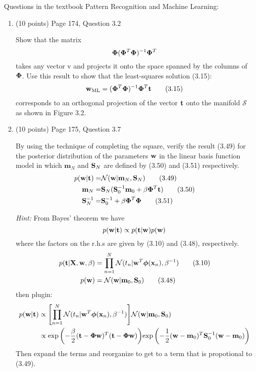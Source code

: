 \documentclass[11pt]{article}
\begin{document}
Questions in the textbook Pattern Recognition and Machine Learning:
\begin{enumerate}
\item (10 points) Page 174, Question 3.2
\begin{framed}
Show that the matrix
$$ \bm{\Phi} (\bm{\Phi}^T \bm{\Phi})^{-1} \bm{\Phi}^T $$
takes any vector v and projects it onto the space spanned by the columns of $\bm{\Phi}$. Use this result to show that the least-squares solution (3.15):
\begin{align*}%
\bw_{\text{ML}} = (\bPhi^T \bPhi)^{-1} \bPhi^T \bt \tag{3.15}
\end{align*}
 corresponds to an orthogonal projection of the vector $\mathbf{t}$ onto the manifold $\mathcal S$ as shown in Figure 3.2.
\end{framed}

\item (10 points) Page 175, Question 3.7
\begin{framed}
By using the technique of completing the square, verify the result (3.49) for the posterior distribution of the parameters $\mathbf{w}$ in the linear basis function model in which $\mathbf m_N$ and $\mathbf{S}_N$ are defined by (3.50) and (3.51) respectively.
{
\begin{align*}
p(\mathbf{w} | \mathbf{t})  =& \mathcal N (\mathbf{w} | \mathbf m_N , \mathbf{S}_N) \tag{3.49}\\
\mathbf m_N   =& \mathbf{S}_N (\mathbf{S}_0^{-1} \mathbf m_0 + \beta \bm{\Phi}^T \mathbf{t})  \tag{3.50}\\
\mathbf{S}_N^{-1}    =& \mathbf{S}_0^{-1} + \beta \bm{\Phi}^T \bm{\Phi}  \tag{3.51}
\end{align*}}
\end{framed}

\textit{Hint:} From Bayes' theorem we have 
$$
p(\mathbf{w} | \mathbf{t}) \propto p(\mathbf{t} | \mathbf{w}) p(\mathbf{w})
$$
where the factors on the r.h.s are given by (3.10) and (3.48), respectively. 
\begin{align*}
p(\mathbf{t} | \mathbf X, \mathbf{w}, \beta ) &= \prod_{n=1}^N \mathcal N (t_n | \mathbf{w}^T \bm{\phi}(\mathbf{x}_n), \beta^{-1} )  \tag {3.10}\\
p(\mathbf{w}) &= \mathcal N (\mathbf{w}| \mathbf m_0, \mathbf{S}_0) \tag {3.48}
\end{align*}
then plugin: 
\begin{align*}
p(\mathbf{w} | \mathbf{t}) 
&\propto 
{\color{black}\left[ \prod_{n=1}^N \mathcal N(t_n | \mathbf{w}^T \bm{\phi}(\mathbf{x}_n), \beta^{-1}) \right]}
{\color{black}\mathcal N (\mathbf{w}| \mathbf m_0, \mathbf{S}_0)}\\
&\propto 
{\color{black}\exp\left( -\frac{\beta}{2} (\mathbf{t}- \bm{\Phi}\mathbf{w})^T (\mathbf{t}- \bm{\Phi}\mathbf{w}) \right) }
{\color{black}\exp\left( -\frac{1}{2}(\mathbf{w}- \mathbf m_0)^T \mathbf{S}_0^{-1} (\mathbf{w}- \mathbf m_0) \right)}
\end{align*}
Then expand the terms and reorganize to get to a term that is propotional to (3.49).


\end{enumerate}
\end{document}
